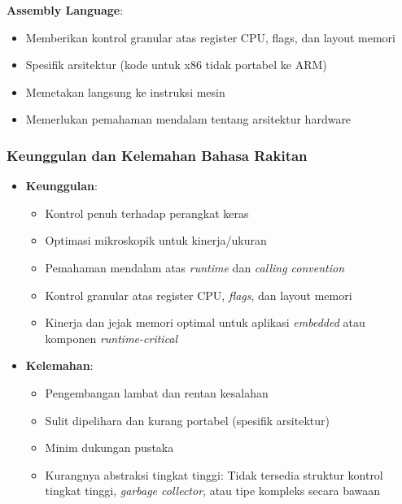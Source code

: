 \documentclass[../main.tex]{subfiles}
\begin{document}
            \textbf{Assembly Language}:
            \begin{itemize}
                \item Memberikan kontrol granular atas register CPU, flags, dan layout memori
                \item Spesifik arsitektur (kode untuk x86 tidak portabel ke ARM)
                \item Memetakan langsung ke instruksi mesin
                \item Memerlukan pemahaman mendalam tentang arsitektur hardware
            \end{itemize}

        \subsubsection{Keunggulan dan Kelemahan Bahasa Rakitan}
            \begin{itemize}
                \item \textbf{Keunggulan}:
                \begin{itemize}
                    \item Kontrol penuh terhadap perangkat keras
                    \item Optimasi mikroskopik untuk kinerja/ukuran
                    \item Pemahaman mendalam atas \textit{runtime} dan \textit{calling convention}
                    \item Kontrol granular atas register CPU, \textit{flags}, dan layout memori
                    \item Kinerja dan jejak memori optimal untuk aplikasi \textit{embedded} atau komponen \textit{runtime-critical}
                \end{itemize}
                \item \textbf{Kelemahan}:
                \begin{itemize}
                    \item Pengembangan lambat dan rentan kesalahan
                    \item Sulit dipelihara dan kurang portabel (spesifik arsitektur)
                    \item Minim dukungan pustaka
                    \item Kurangnya abstraksi tingkat tinggi: Tidak tersedia struktur kontrol tingkat tinggi, \textit{garbage collector}, atau tipe kompleks secara bawaan
                \end{itemize}
            \end{itemize}
\end{document}

